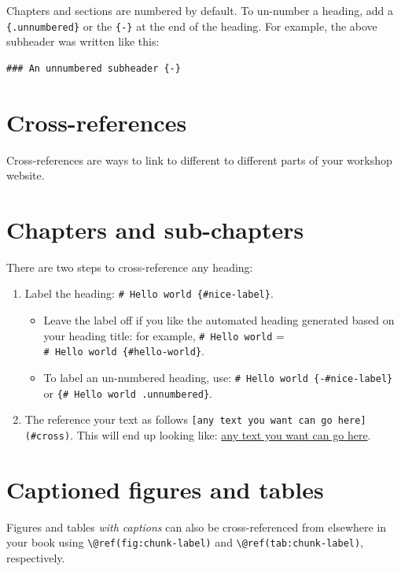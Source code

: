 \documentclass[
]{book}
\providecommand{\tightlist}{%
  \setlength{\itemsep}{0pt}\setlength{\parskip}{0pt}}
\theoremstyle{definition}
\theoremstyle{definition}
\theoremstyle{definition}
\theoremstyle{definition}
\theoremstyle{remark}
\begin{document}
Chapters and sections are numbered by default. To un-number a heading, add a \texttt{\{.unnumbered\}} or the \texttt{\{-\}} at the end of the heading. For example, the above subheader was written like this:

\begin{verbatim}
### An unnumbered subheader {-}
\end{verbatim}

\section{Cross-references}\label{cross}

Cross-references are ways to link to different to different parts of your workshop website.

\section{Chapters and sub-chapters}\label{chapters-and-sub-chapters}

There are two steps to cross-reference any heading:

\begin{enumerate}
\def\labelenumi{\arabic{enumi}.}
\tightlist
\item
  Label the heading: \texttt{\#\ Hello\ world\ \{\#nice-label\}}.

  \begin{itemize}
  \tightlist
  \item
    Leave the label off if you like the automated heading generated based on your heading title: for example, \texttt{\#\ Hello\ world} = \texttt{\#\ Hello\ world\ \{\#hello-world\}}.
  \item
    To label an un-numbered heading, use: \texttt{\#\ Hello\ world\ \{-\#nice-label\}} or \texttt{\{\#\ Hello\ world\ .unnumbered\}}.
  \end{itemize}
\item
  The reference your text as follows \texttt{{[}any\ text\ you\ want\ can\ go\ here{]}(\#cross)}. This will end up looking like: \hyperref[cross]{any text you want can go here}.
\end{enumerate}

\section{Captioned figures and tables}\label{captioned-figures-and-tables}

Figures and tables \emph{with captions} can also be cross-referenced from elsewhere in your book using \texttt{\textbackslash{}@ref(fig:chunk-label)} and \texttt{\textbackslash{}@ref(tab:chunk-label)}, respectively.
\end{document}
